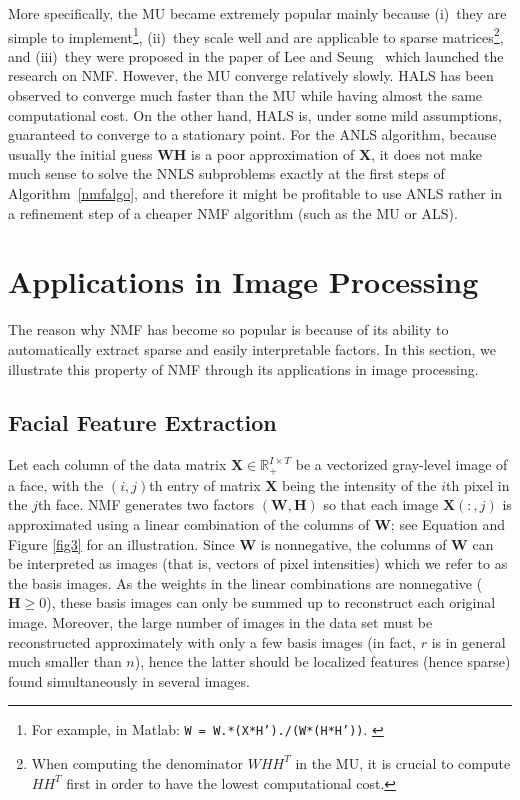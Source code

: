 \documentclass[11pt]{article}
\begin{document}
More specifically, the MU became extremely popular mainly because 
	(i)~they are simple to implement\footnote{For example, in Matlab: \texttt{W = W.*(X*H')./(W*(H*H'))}. \label{fn2}}, 
	(ii)~they scale well and are applicable to sparse matrices\footnote{When computing the denominator $WHH^T$ in the MU, it is crucial to compute $HH^T$ first in order to have the lowest computational cost.}, 
	and 
	(iii)~they were proposed in the paper of Lee and Seung~\cite{93} which launched the research on NMF. However, the MU converge relatively slowly. HALS has been observed to converge much faster than the MU while having almost the same computational cost. On the other hand, HALS is, under some mild assumptions, guaranteed to converge to a stationary point. For the ANLS algorithm, because usually the initial guess $\mathbf{WH}$ is a poor approximation of $\mathbf{X}$, it does not make much sense to solve the NNLS subproblems exactly at the first steps of Algorithm~\ref{nmfalgo}, and therefore it might be profitable to use ANLS rather in a refinement step of a cheaper NMF algorithm (such as the MU or ALS). 

\section{Applications in Image Processing}
The reason why NMF has become so popular is because of its ability to automatically extract sparse and easily interpretable factors. In this section, we illustrate this property of NMF through its applications in image processing.

\subsection{Facial Feature Extraction}

Let each column of the data matrix $\mathbf{X} \in \mathbb{R}^{I \times T}_+$ be a vectorized gray-level image of a face, with the $(i, j)$th entry of matrix $\mathbf{X}$ being the intensity of the $i$th pixel in the $j$th face. NMF generates two factors $(\mathbf{W}, \mathbf{H})$ so that each image $\mathbf{X}(:, j)$ is approximated using a linear combination of the columns of $\mathbf{W}$; see Equation and Figure \ref{fig3} for an illustration. Since $\mathbf{W}$ is nonnegative, the columns of $\mathbf{W}$ can be interpreted as images (that is, vectors of pixel intensities) which we refer to as the basis images. As the weights in the linear combinations are nonnegative ($\mathbf{H} \geq 0$), these basis images can only be summed up to reconstruct each original image. Moreover, the large number of images in the data set must be reconstructed approximately with only a few basis images (in fact, $r$ is in general much smaller than $n$), hence the latter should be localized features (hence sparse) found simultaneously in several images.
\end{document}
